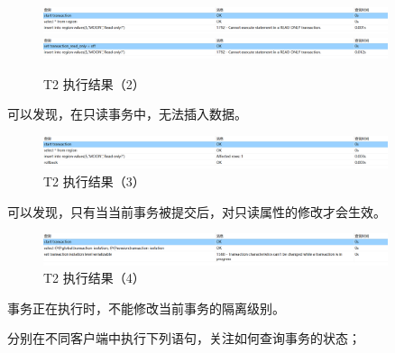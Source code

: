\documentclass{article}
\begin{document}
\begin{figure}[H]
  \centering
  \includegraphics[width=0.9\textwidth]{img/41.png}
  \includegraphics[width=0.9\textwidth]{img/42.png}
  \caption{T2 执行结果（2）}
\end{figure}

可以发现，在只读事务中，无法插入数据。

\begin{figure}[H]
  \centering
  \includegraphics[width=0.9\textwidth]{img/43.png}
  \caption{T2 执行结果（3）}
\end{figure}

可以发现，只有当当前事务被提交后，对只读属性的修改才会生效。

\begin{figure}[H]
  \centering
  \includegraphics[width=0.9\textwidth]{img/44.png}
  \caption{T2 执行结果（4）}
\end{figure}

事务正在执行时，不能修改当前事务的隔离级别。

分别在不同客户端中执行下列语句，关注如何查询事务的状态；
\end{document}
